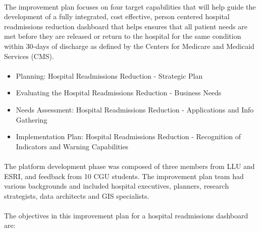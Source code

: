 \documentclass[11pt]{article}\usepackage[]{graphicx}\usepackage[]{color}
\begin{document}
\paragraph{}
The improvement plan focuses on four target capabilities that will help guide the development of a fully integrated, cost effective, person centered hospital readmissions reduction dashboard that helps ensures that all patient needs are met before they are released or return to the hospital for the same condition within 30-days of discharge as defined by the Centers for Medicare and Medicaid Services (CMS).
\paragraph{}

\begin{itemize}

\item Planning: Hospital Readmissions Reduction - Strategic Plan 
\item Evaluating the Hospital Readmissions Reduction -  Business Needs 
\item Needs Assessment: Hospital Readmissions Reduction - Applications and Info Gathering 
\item Implementation Plan: Hospital Readmissions Reduction - Recognition of Indicators and Warning Capabilities

\end{itemize}
\paragraph{}
The platform development phase was composed of three members from LLU and ESRI, and feedback from 10 CGU students. The improvement plan team had various backgrounds and included hospital executives, planners, research strategists, data architects and GIS specialists.
\paragraph{}

The objectives in this improvement plan for a hospital readmissions dashboard are:
\end{document}
